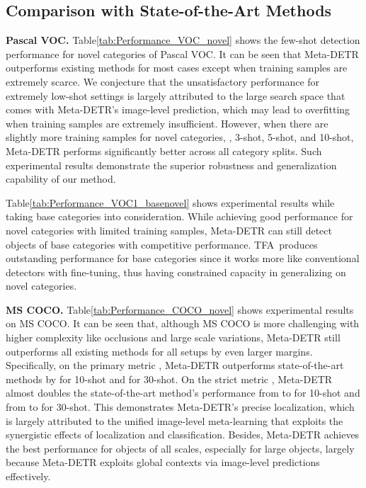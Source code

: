 \documentclass[10pt,twocolumn,letterpaper]{article}
\begin{document}
\subsection{Comparison with State-of-the-Art Methods}

\noindent
\textbf{Pascal VOC.} Table\;\ref{tab:Performance_VOC_novel} shows the few-shot detection performance for novel categories of Pascal VOC. It can be seen that Meta-DETR outperforms existing methods for most cases except when training samples are extremely scarce. We conjecture that the unsatisfactory performance for extremely low-shot settings is largely attributed to the large search space that comes with Meta-DETR's image-level prediction, which may lead to overfitting when training samples are extremely insufficient. However, when there are slightly more training samples for novel categories, \eg, 3-shot, 5-shot, and 10-shot, Meta-DETR performs significantly better across all category splits. Such experimental results demonstrate the superior robustness and generalization capability of our method.

Table\;\ref{tab:Performance_VOC1_basenovel} shows experimental results while taking base categories into consideration. While achieving good performance for novel categories with limited training samples, Meta-DETR can still detect objects of base categories with competitive performance. TFA\,\cite{fsdet} produces outstanding performance for base categories since it works more like conventional detectors with fine-tuning, thus having constrained capacity in generalizing on novel categories.

\medskip
\noindent
\textbf{MS COCO.}
Table\;\ref{tab:Performance_COCO_novel} shows experimental results on MS COCO. It can be seen that, although MS COCO is more challenging with higher complexity like occlusions and large scale variations, Meta-DETR still outperforms all existing methods for all setups by even larger margins.
Specifically, on the primary metric , Meta-DETR outperforms state-of-the-art methods by  for 10-shot and  for 30-shot. On the strict metric , Meta-DETR almost doubles the state-of-the-art method's performance from  to  for 10-shot and from  to  for 30-shot. This demonstrates Meta-DETR's precise localization, which is largely attributed to the unified image-level meta-learning that exploits the synergistic effects of localization and classification. Besides, Meta-DETR achieves the best performance for objects of all scales, especially for large objects, largely because Meta-DETR exploits global contexts via image-level predictions effectively.
\end{document}
